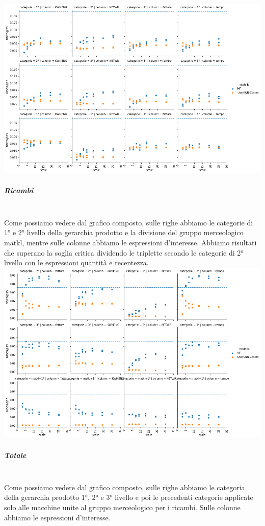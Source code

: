 \includegraphics[width=16cm]{figures/risultati_minmax_categoria_macchine.png}
\newpage

\subparagraph{Ricambi}\mbox{} \\
Come possiamo vedere dal grafico composto, sulle righe abbiamo le categorie di 1° e 2° livello della gerarchia prodotto e la divisione del gruppo merceologico matkl, mentre sulle colonne abbiamo le espressioni d'interesse. Abbiamo risultati che superano la soglia critica dividendo le triplette secondo le categorie di 2° livello con le espressioni quantità e recentezza.\\

\includegraphics[width=16cm]{figures/risultati_minmax_categoria_ricambi.png}

\subparagraph{Totale}\mbox{} \\
Come possiamo vedere dal grafico composto, sulle righe abbiamo le categoria della gerarchia prodotto 1°, 2° e 3° livello e poi le precedenti categorie applicate solo alle macchine unite al gruppo merceologico per i ricambi. Sulle colonne abbiamo le espressioni d'interesse.\\

